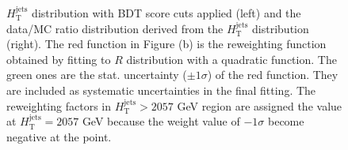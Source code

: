 \begin{figure}[H]
  \caption{$H_{\text{T}}^{\text{jets}}$ distribution with BDT score cuts applied (left) and the data/MC ratio distribution derived from the $H_{\text{T}}^{\text{jets}}$ distribution (right). The red function in Figure (b) is the reweighting function obtained by fitting to $R$ distribution with a quadratic function. The green ones are the stat. uncertainty (${\pm}1{\sigma}$) of the red function. They are included as systematic uncertainties in the final fitting. The reweighting factors in $H_{\text{T}}^{\text{jets}}>2057$ GeV region are assigned the value at $H_{\text{T}}^{\text{jets}}=2057$ GeV because the weight value of $-1\sigma$ become negative at the point. }
  \label{fig:HTjets_for_RW}
\end{figure}


